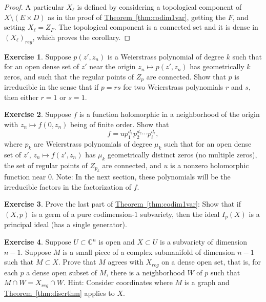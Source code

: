 \documentclass[12pt,openany]{book}
\newcommand{\C}{{\mathbb{C}}}
\theoremstyle{plain}
\theoremstyle{remark}
\theoremstyle{definition}
\newenvironment{exbox}{%
    \def\FrameCommand{\vrule width 1pt \relax\hspace{10pt}}%
    \MakeFramed{\advance\hsize-\width\FrameRestore}%
}{%
    \endMakeFramed
}
\theoremstyle{exercise}
\newtheorem{exercise}{Exercise}[section]
\theoremstyle{example}
\newcommand{\thmref}[1]{\hyperref[#1]{Theorem~\ref*{#1}}}
\begin{document}
\begin{proof}
A particular $X_\ell$ is defined by considering a topological component of $X \setminus
(E \times D)$ as in the proof of \thmref{thm:codim1var}, getting the $F$,
and setting $X_\ell = Z_F$.
The topological component is a connected set and it is dense in
$(X_\ell)_{\mathit{reg}}$, which proves the corollary.
\end{proof}

\begin{exbox}
\begin{exercise}
Suppose $p(z',z_n)$ is a Weierstrass polynomial of degree $k$ such that
for an open dense set of $z'$ near the origin
$z_n \mapsto p(z',z_n)$ has geometrically $k$ zeros, and such that the
regular points of $Z_p$ are connected.  Show that $p$ is
irreducible in the sense that if $p = rs$ for two Weierstrass polynomials
$r$ and $s$, then either $r=1$ or $s=1$.
\end{exercise}

\begin{exercise}
Suppose $f$ is a function holomorphic in a neighborhood of the origin with
$z_n \mapsto f(0,z_n)$ being of finite order.  Show that
\begin{equation*}
f = u p_1^{d_1} p_2^{d_2} \cdots p_\ell^{d_\ell} ,
\end{equation*}
where $p_k$ are Weierstrass polynomials of degree $\mu_k$ such that
for an open dense set of $z'$, $z_n \mapsto f(z',z_n)$
has $\mu_k$ geometrically distinct zeros (no multiple zeros),
the set of regular points of $Z_{p_k}$ are
connected, and $u$ is a nonzero holomorphic function near $0$.
Note: In the next section, these
polynomials will be the irreducible factors in the factorization of $f$.
\end{exercise}

\begin{exercise} \label{exercise:singlegenerator}
Prove the last part of \thmref{thm:codim1var}:
Show that if $(X,p)$ is a germ of a pure codimension-$1$ subvariety, then
the ideal $I_p(X)$ is a principal ideal (has a single generator).
\end{exercise}

\begin{exercise} \label{exercise:hypersurfaceinhypervariety}
Suppose $U \subset \C^n$ is open and $X \subset U$
is a subvariety of dimension $n-1$.  Suppose $M$
is a small piece of a complex submanifold of dimension $n-1$ such that
$M \subset X$.  Prove that $M$ agrees with $X_{\textit{reg}}$ on a dense
open set, that is,
for each $p$ a dense open subset of $M$,
there is a neighborhood $W$ of $p$ such that
$M \cap W = X_{\textit{reg}} \cap W$.
Hint: Consider coordinates where
$M$ is a graph and \thmref{thm:discrthm} applies to $X$.
\end{exercise}


\end{exbox}
\end{document}
